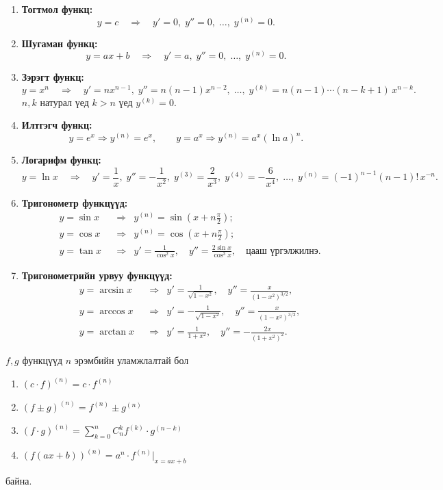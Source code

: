 \begin{enumerate}
  \item \textbf{Тогтмол функц:} 
  \[
  y = c \quad \Rightarrow \quad y' = 0, \; y'' = 0, \; \ldots, \; y^{(n)} = 0.
  \]

  \item \textbf{Шугаман функц:} 
  \[
  y = ax + b \quad \Rightarrow \quad y' = a, \; y'' = 0, \; \ldots, \; y^{(n)} = 0.
  \]

  \item \textbf{Зэрэгт функц:} 
 \[
  y = x^n \quad \Rightarrow \quad 
  y' = n x^{n-1}, \;
  y'' = n(n-1) x^{n-2}, \;
  \ldots,\;
  y^{(k)} = n(n-1)\cdots (n-k+1)\, x^{n-k}.
  \] $n, k$ натурал үед 
  $k>n$ үед $y^{(k)}=0$.
  \item \textbf{Илтгэгч функц:} 
  \[
  y = e^{x} \Rightarrow y^{(n)} = e^{x}, 
  \qquad
  y = a^{x} \Rightarrow y^{(n)} = a^{x}(\ln a)^{n}.
  \]

  \item \textbf{Логарифм функц:} 
  \[
  y = \ln x \quad \Rightarrow \quad 
  y' = \frac{1}{x}, \;
  y'' = -\frac{1}{x^{2}}, \;
  y^{(3)} = \frac{2}{x^{3}}, \;
  y^{(4)} = -\frac{6}{x^{4}}, \;
  \ldots,\;
  y^{(n)} = (-1)^{n-1}(n-1)!\, x^{-n}.
  \]

  \item \textbf{Тригонометр функцүүд:}
  \[
  \begin{aligned}
  &y = \sin x 
    &&\Rightarrow&
    y^{(n)} = \sin\!\left(x + n\frac{\pi}{2}\right);\\[3pt]
  &y = \cos x 
    &&\Rightarrow&
    y^{(n)} = \cos\!\left(x + n\frac{\pi}{2}\right);\\[3pt]
  &y = \tan x 
    &&\Rightarrow&
    y' = \frac{1}{\cos^{2}x}, \quad
    y'' = \frac{2\sin x}{\cos^{3}x}, \quad \text{цааш үргэлжилнэ.}
  \end{aligned}
  \]

  \item \textbf{Тригонометрийн урвуу функцүүд:}
  \[
  \begin{aligned}
  &y = \arcsin x 
    &&\Rightarrow&
    y' = \frac{1}{\sqrt{1-x^{2}}}, \quad 
    y'' = \frac{x}{(1-x^{2})^{3/2}},\\[3pt]
  &y = \arccos x 
    &&\Rightarrow&
    y' = -\frac{1}{\sqrt{1-x^{2}}}, \quad 
    y'' = \frac{x}{(1-x^{2})^{3/2}},\\[3pt]
  &y = \arctan x 
    &&\Rightarrow&
    y' = \frac{1}{1+x^{2}}, \quad 
    y'' = -\frac{2x}{(1+x^{2})^{2}}.
  \end{aligned}
  \]

\end{enumerate}
\begin{theorem}
$f,g$ функцүүд $n$ эрэмбийн уламжлалтай бол 
    \begin{enumerate}
        \item $(c\cdot f)^{(n)}=c\cdot f^{(n)}$
        \item $(f\pm g)^{(n)}=f^{(n)}\pm g^{(n)}$
        \item $(f\cdot g)^{(n)}=\sum\limits_{k=0}^{n}C_n^kf^{(k)}\cdot g^{(n-k)}$
        \item $(f(ax+b))^{(n)}=a^n\cdot f^{(n)}|_{x=ax+b}$
    \end{enumerate} байна.
\end{theorem}

